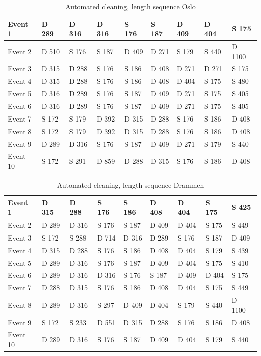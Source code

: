 \begin{table}[H]
\centering
\caption{Automated cleaning, length sequence Oslo}
\label{tab:ACSequenceOslo}
\begin{tabular}{|l|l|l|l|l|l|l|l|l|}
\hline
Event 1  & D 289 & D 316 & D 316 & S 176 & S 187 & D 409 & D 404 & S 175  \\ \hline
Event 2  & D 510 & S 176 & S 187 & D 409 & D 271 & S 179 & S 440 & D 1100 \\ \hline
Event 3  & D 315 & D 288 & S 176 & S 186 & D 408 & D 271 & D 271 & S 175  \\ \hline
Event 4  & D 315 & D 288 & S 176 & S 186 & D 408 & D 404 & S 175 & S 480  \\ \hline
Event 5  & D 316 & D 289 & S 176 & S 187 & D 409 & D 271 & S 175 & S 405  \\ \hline
Event 6  & D 316 & D 289 & S 176 & S 187 & D 409 & D 271 & S 175 & S 405  \\ \hline
Event 7  & S 172 & S 179 & D 392 & D 315 & D 288 & S 176 & S 186 & D 408  \\ \hline
Event 8  & S 172 & S 179 & D 392 & D 315 & D 288 & S 176 & S 186 & D 408  \\ \hline
Event 9  & D 289 & D 316 & S 176 & S 187 & D 409 & D 271 & S 179 & S 440  \\ \hline
Event 10 & S 172 & S 291 & D 859 & D 288 & D 315 & S 176 & S 186 & D 408  \\ \hline
\end{tabular}
\end{table}


\begin{table}[H]
\centering
\caption{Automated cleaning, length sequence Drammen}
\label{tab:ACSequenceDrammen}
\begin{tabular}{|l|l|l|l|l|l|l|l|l|}
\hline
Event 1  & D 315 & D 288 & S 176 & S 186 & D 408 & D 404 & S 175 & S 425  \\ \hline
Event 2  & D 289 & D 316 & S 176 & S 187 & D 409 & D 404 & S 175 & S 449  \\ \hline
Event 3  & S 172 & S 288 & D 714 & D 316 & D 289 & S 176 & S 187 & D 409  \\ \hline
Event 4  & D 315 & D 288 & S 176 & S 186 & D 408 & D 404 & S 179 & S 439  \\ \hline
Event 5  & D 289 & D 316 & S 176 & S 187 & D 409 & D 404 & S 175 & S 410  \\ \hline
Event 6  & D 289 & D 316 & D 316 & S 176 & S 187 & D 409 & D 404 & S 175  \\ \hline
Event 7  & D 288 & D 315 & S 176 & S 186 & D 408 & D 404 & S 175 & S 449  \\ \hline
Event 8  & D 289 & D 316 & S 297 & D 409 & D 404 & S 179 & S 440 & D 1100 \\ \hline
Event 9  & S 172 & S 233 & D 551 & D 315 & D 288 & S 176 & S 186 & D 408  \\ \hline
Event 10 & D 289 & D 316 & S 176 & S 187 & D 409 & D 404 & S 179 & S 440  \\ \hline
\end{tabular}
\end{table}

